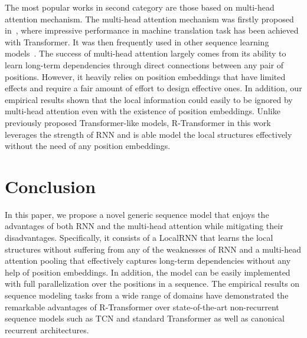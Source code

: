 \documentclass{article} \usepackage{iclr2019_conference,times}
\begin{document}
The most popular works in second category are those based on multi-head attention mechanism. The multi-head attention mechanism was firstly proposed in~\citet{vaswani2017attention}, where impressive performance in machine translation task has been achieved with Transformer. It was then frequently used in other sequence learning models~\citep{devlin2018bert,dehghani2018universal,dai2019transformer}. The success of multi-head attention largely comes from its ability to learn long-term dependencies through direct connections between any pair of positions. However, it heavily relies on position embeddings that have limited effects and require a fair amount of effort to design effective ones. In addition, our empirical results shown that the local information could easily to be ignored by multi-head attention even with the existence of position embeddings. Unlike previously proposed Transformer-like models, R-Transformer in this work leverages the strength of RNN and is able model the local structures effectively without the need of any position embeddings.  \section{Conclusion}
In this paper, we propose a novel generic sequence model that enjoys the advantages of both RNN and the multi-head attention while mitigating their disadvantages. Specifically, it consists of a LocalRNN that learns the local structures without suffering from any of the weaknesses of RNN and a multi-head attention pooling that effectively captures long-term dependencies without any help of position embeddings. In addition, the model can be easily implemented with full parallelization over the positions in a sequence. The empirical results on sequence modeling tasks from a wide range of domains have demonstrated the remarkable advantages of R-Transformer over state-of-the-art non-recurrent sequence models such as TCN and standard Transformer as well as canonical recurrent architectures. 


\end{document}

